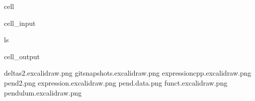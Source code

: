 \documentclass[a4paper,10pt,english]{jupyterBook}
\begin{document}
\begin{sphinxuseclass}{cell}\begin{sphinxVerbatimInput}

\begin{sphinxuseclass}{cell_input}
\begin{sphinxVerbatim}[commandchars=\\\{\}]
ls
\end{sphinxVerbatim}

\end{sphinxuseclass}\end{sphinxVerbatimInput}
\begin{sphinxVerbatimOutput}

\begin{sphinxuseclass}{cell_output}
\begin{sphinxVerbatim}[commandchars=\\\{\}]
deltas2.excalidraw.png         gitsnapshots.excalidraw.png
expression\PYGZus{}cpp.excalidraw.png  pend2.png
expression.excalidraw.png      pend.data.png
funct.excalidraw.png           pendulum.excalidraw.png
\end{sphinxVerbatim}

\end{sphinxuseclass}\end{sphinxVerbatimOutput}

\end{sphinxuseclass}
\end{document}
